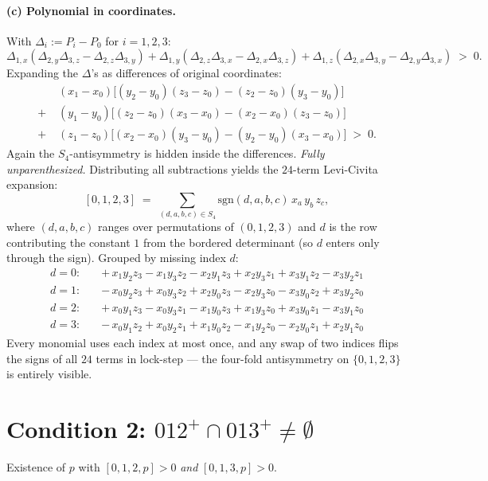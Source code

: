 \documentclass[11pt]{article}
\begin{document}
\paragraph{(c) Polynomial in coordinates.}
With $\Delta_i := P_i - P_0$ for $i=1,2,3$:
\[
\Delta_{1,x}(\Delta_{2,y}\Delta_{3,z} - \Delta_{2,z}\Delta_{3,y})
+ \Delta_{1,y}(\Delta_{2,z}\Delta_{3,x} - \Delta_{2,x}\Delta_{3,z})
+ \Delta_{1,z}(\Delta_{2,x}\Delta_{3,y} - \Delta_{2,y}\Delta_{3,x}) \;>\; 0.
\]
Expanding the $\Delta$'s as differences of original coordinates:
\[
\begin{aligned}
&(x_1{-}x_0)\bigl[(y_2{-}y_0)(z_3{-}z_0) - (z_2{-}z_0)(y_3{-}y_0)\bigr] \\
+\;&(y_1{-}y_0)\bigl[(z_2{-}z_0)(x_3{-}x_0) - (x_2{-}x_0)(z_3{-}z_0)\bigr] \\
+\;&(z_1{-}z_0)\bigl[(x_2{-}x_0)(y_3{-}y_0) - (y_2{-}y_0)(x_3{-}x_0)\bigr] \;>\; 0.
\end{aligned}
\]
Again the $S_4$-antisymmetry is hidden inside the differences.
\emph{Fully unparenthesized.} Distributing all subtractions yields the $24$-term
Levi-Civita expansion:
\[
[0,1,2,3] \;=\; \sum_{(d,a,b,c)\in S_4} \mathrm{sgn}(d,a,b,c)\, x_a\, y_b\, z_c,
\]
where $(d,a,b,c)$ ranges over permutations of $(0,1,2,3)$ and $d$ is the row
contributing the constant $1$ from the bordered determinant (so $d$ enters only
through the sign). Grouped by missing index $d$:
\[
\begin{aligned}
d{=}0:\quad &+\,x_1 y_2 z_3 - x_1 y_3 z_2 - x_2 y_1 z_3 + x_2 y_3 z_1 + x_3 y_1 z_2 - x_3 y_2 z_1 \\
d{=}1:\quad &-\,x_0 y_2 z_3 + x_0 y_3 z_2 + x_2 y_0 z_3 - x_2 y_3 z_0 - x_3 y_0 z_2 + x_3 y_2 z_0 \\
d{=}2:\quad &+\,x_0 y_1 z_3 - x_0 y_3 z_1 - x_1 y_0 z_3 + x_1 y_3 z_0 + x_3 y_0 z_1 - x_3 y_1 z_0 \\
d{=}3:\quad &-\,x_0 y_1 z_2 + x_0 y_2 z_1 + x_1 y_0 z_2 - x_1 y_2 z_0 - x_2 y_0 z_1 + x_2 y_1 z_0
\end{aligned}
\]
Every monomial uses each index at most once, and any swap of two indices flips the
signs of all $24$ terms in lock-step --- the four-fold antisymmetry on $\{0,1,2,3\}$
is entirely visible.

\section*{Condition 2: \texorpdfstring{$012^+ \cap 013^+ \neq \emptyset$}{012+ cap 013+ nonempty}}

Existence of $p$ with $[0,1,2,p] > 0$ \emph{and} $[0,1,3,p] > 0$.
\end{document}
